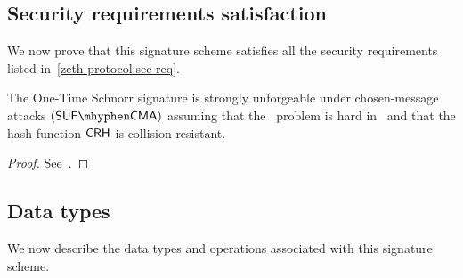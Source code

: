 \subsection{Security requirements satisfaction}

We now prove that this signature scheme satisfies all the security requirements listed in~\cref{zeth-protocol:sec-req}.

\begin{theorem}
    The One-Time Schnorr signature is strongly unforgeable under chosen-message attacks $(\sufcma)$ assuming that the \omdlog~problem is hard in \gset~and that the hash function $\mathsf{CRH}$ is collision resistant.

\begin{proof}
    See~\cite[Theorems 5.1, 5.2 and 6.1]{bellare2007two}.
\end{proof}

\end{theorem}

\subsection{Data types}\label{instantiation:otsig:data-types}

We now describe the data types and operations associated with this signature scheme.

